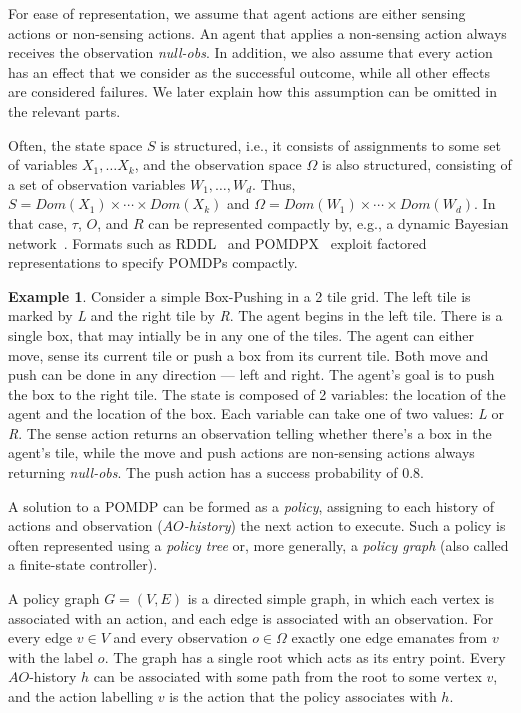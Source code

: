 \documentclass[letterpaper]{article} %
\theoremstyle{definition}
\newtheorem{example}{Example}
\begin{document}
For ease of representation, we assume that agent actions are either sensing actions or non-sensing actions. An agent that applies a non-sensing action always receives the observation {\em null-obs}. In addition, we also assume that every action has 
an effect that we consider as the successful outcome, while all other effects are considered failures. We later explain how this assumption can be omitted in the relevant parts.

Often, the state space $S$ is structured, i.e., it consists of assignments to some set of variables $X_1,\ldots X_k$, and the observation space $\Omega$ is
also structured, consisting of a set of observation variables $W_1,\ldots, W_d$. 
Thus, $S=Dom(X_1)\times\cdots\times Dom(X_k)$ and
$\Omega = Dom(W_1)\times\cdots\times Dom(W_d)$. 
In that case, $\tau$, $O$, and $R$ can be represented compactly by, e.g., a dynamic Bayesian network~\cite{BAYESNETWORK}. Formats such as RDDL~\cite{RDDL} and POMDPX~\cite{POMDPX}
exploit factored representations to specify POMDPs compactly.

\begin{example}
Consider a simple Box-Pushing in a 2 tile grid. The left tile is marked by \emph{L} and the right tile by \emph{R}. The agent begins in the left tile. There is a single box, that may intially be in any one of the tiles. The agent can either move, sense its current tile or push a box from its current tile. Both move and push can be done in any direction --- left and right. The agent's goal is to push the box to the right tile.
The state is composed of 2 variables: the location of the agent and the location of the box. Each variable can take one of two values: \emph{L} or \emph{R}.
The sense action returns an observation telling whether there's a box in the agent's tile, while the move and push actions are non-sensing actions always returning {\em null-obs}.
The push action has a success probability of 0.8.
\end{example}

A solution to a POMDP can be formed as a {\em policy}, assigning to each history of actions and observation ({\em $AO$-history}) the next action to execute. 
Such a policy is often represented using a {\em policy tree} or, more generally, a {\em policy graph} (also called a finite-state controller). 

A policy graph $G=(V,E)$ is a directed simple graph, in which each vertex is associated with an action, and each edge is associated with an observation.
For every edge $v\in V$ and every observation $o\in\Omega$ exactly one edge emanates from $v$ with the label $o$.
The graph has a single root which acts as its entry point. Every $AO$-history $h$ can be associated with some path from the root to some vertex $v$,
and the action labelling $v$ is the action that the policy associates with $h$.
\end{document}

